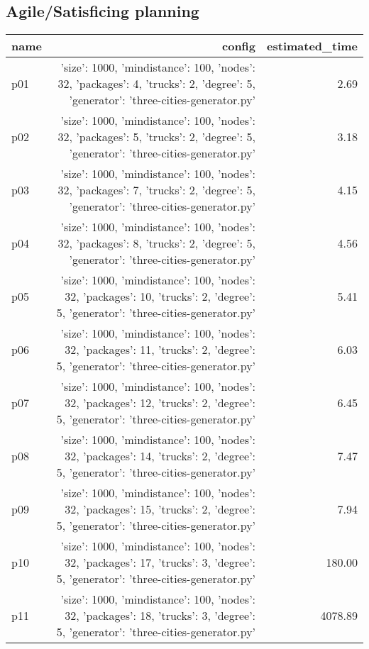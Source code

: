\documentclass{article}
\begin{document}
                                \subsection*{Agile/Satisficing planning}
                                
                            \begin{center}
                            \scriptsize
                            \begin{tabular}{@{}l|r|r@{}}
                            name & config & estimated\_time\\\midrule
                              p01&{'size': 1000, 'mindistance': 100, 'nodes': 32, 'packages': 4, 'trucks': 2, 'degree': 5, 'generator': 'three-cities-generator.py'}&2.69\\
  p02&{'size': 1000, 'mindistance': 100, 'nodes': 32, 'packages': 5, 'trucks': 2, 'degree': 5, 'generator': 'three-cities-generator.py'}&3.18\\
  p03&{'size': 1000, 'mindistance': 100, 'nodes': 32, 'packages': 7, 'trucks': 2, 'degree': 5, 'generator': 'three-cities-generator.py'}&4.15\\
  p04&{'size': 1000, 'mindistance': 100, 'nodes': 32, 'packages': 8, 'trucks': 2, 'degree': 5, 'generator': 'three-cities-generator.py'}&4.56\\
  p05&{'size': 1000, 'mindistance': 100, 'nodes': 32, 'packages': 10, 'trucks': 2, 'degree': 5, 'generator': 'three-cities-generator.py'}&5.41\\
  p06&{'size': 1000, 'mindistance': 100, 'nodes': 32, 'packages': 11, 'trucks': 2, 'degree': 5, 'generator': 'three-cities-generator.py'}&6.03\\
  p07&{'size': 1000, 'mindistance': 100, 'nodes': 32, 'packages': 12, 'trucks': 2, 'degree': 5, 'generator': 'three-cities-generator.py'}&6.45\\
  p08&{'size': 1000, 'mindistance': 100, 'nodes': 32, 'packages': 14, 'trucks': 2, 'degree': 5, 'generator': 'three-cities-generator.py'}&7.47\\
  p09&{'size': 1000, 'mindistance': 100, 'nodes': 32, 'packages': 15, 'trucks': 2, 'degree': 5, 'generator': 'three-cities-generator.py'}&7.94\\
  p10&{'size': 1000, 'mindistance': 100, 'nodes': 32, 'packages': 17, 'trucks': 3, 'degree': 5, 'generator': 'three-cities-generator.py'}&180.00\\
  p11&{'size': 1000, 'mindistance': 100, 'nodes': 32, 'packages': 18, 'trucks': 3, 'degree': 5, 'generator': 'three-cities-generator.py'}&4078.89\\

\end{tabular}
\end{center}
\end{document}
